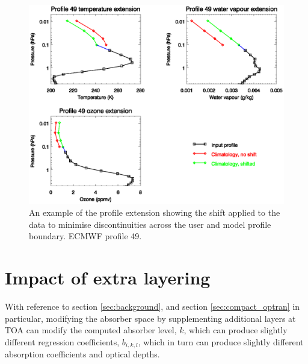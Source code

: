 \begin{figure}[htp]
  \centering
  \includegraphics[scale=0.8]{graphics/ECMWF.blended_profile_49.eps}
  \caption{An example of the profile extension showing the shift applied to the data to minimise discontinuities across the user and model profile boundary. ECMWF profile 49.}
  \label{fig:blended_profile49}
\end{figure}


\section{Impact of extra layering}
With reference to section \ref{sec:background}, and section \ref{sec:compact_optran} in particular, modifying the absorber space by supplementing additional layers at TOA can modify the computed absorber level, $k$, which can produce slightly different regression coefficients, $b_{i,k,l}$, which in turn can produce slightly different absorption coefficients and optical depths.

